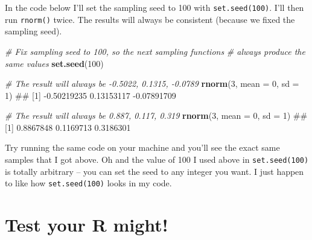 \documentclass[]{book}
\newenvironment{Shaded}{\begin{snugshade}}{\end{snugshade}}
\newcommand{\KeywordTok}[1]{\textcolor[rgb]{0.13,0.29,0.53}{\textbf{#1}}}
\newcommand{\DataTypeTok}[1]{\textcolor[rgb]{0.13,0.29,0.53}{#1}}
\newcommand{\DecValTok}[1]{\textcolor[rgb]{0.00,0.00,0.81}{#1}}
\newcommand{\CommentTok}[1]{\textcolor[rgb]{0.56,0.35,0.01}{\textit{#1}}}
\newcommand{\NormalTok}[1]{#1}
\theoremstyle{definition}
\theoremstyle{definition}
\theoremstyle{remark}
\begin{document}
In the code below I'll set the sampling seed to 100 with
\texttt{set.seed(100)}. I'll then run \texttt{rnorm()} twice. The
results will always be consistent (because we fixed the sampling seed).

\begin{Shaded}
\begin{Highlighting}[]
\CommentTok{# Fix sampling seed to 100, so the next sampling functions}
\CommentTok{#   always produce the same values}
\KeywordTok{set.seed}\NormalTok{(}\DecValTok{100}\NormalTok{)}

\CommentTok{# The result will always be -0.5022, 0.1315, -0.0789}
\KeywordTok{rnorm}\NormalTok{(}\DecValTok{3}\NormalTok{, }\DataTypeTok{mean =} \DecValTok{0}\NormalTok{, }\DataTypeTok{sd =} \DecValTok{1}\NormalTok{)}
\NormalTok{## [1] -0.50219235  0.13153117 -0.07891709}

\CommentTok{# The result will always be 0.887, 0.117, 0.319}
\KeywordTok{rnorm}\NormalTok{(}\DecValTok{3}\NormalTok{, }\DataTypeTok{mean =} \DecValTok{0}\NormalTok{, }\DataTypeTok{sd =} \DecValTok{1}\NormalTok{)}
\NormalTok{## [1] 0.8867848 0.1169713 0.3186301}
\end{Highlighting}
\end{Shaded}

Try running the same code on your machine and you'll see the exact same
samples that I got above. Oh and the value of 100 I used above in
\texttt{set.seed(100)} is totally arbitrary -- you can set the seed to
any integer you want. I just happen to like how \texttt{set.seed(100)}
looks in my code.

\section{Test your R might!}\label{test-your-r-might-1}
\end{document}
